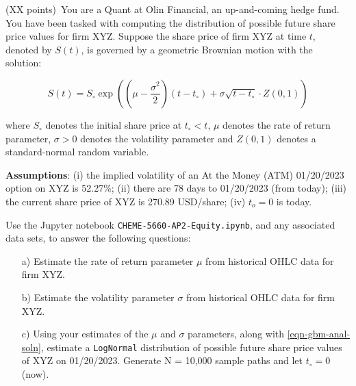 \item{(XX points)~You are a Quant at Olin Financial, an up-and-coming hedge fund. You have been tasked with computing the distribution of possible future share price values for firm XYZ.
Suppose the share price of firm XYZ at time $t$, denoted by $S(t)$, is governed by a geometric Brownian motion with the solution:

\begin{equation}\label{eqn-gbm-anal-soln}
S(t) = S_{\circ}\exp\left(\left(\mu - \frac{\sigma^{2}}{2}\right)\left(t-t_{\circ}\right)+\sigma\sqrt{t-t_{\circ}}\cdot{Z(0,1)}\right)
\end{equation}

where $S_{\circ}$ denotes the initial share price at $t_{\circ}<t$, $\mu$ denotes the rate of return parameter, 
$\sigma>0$ denotes the volatility parameter and $Z\left(0,1\right)$ denotes a standard-normal random variable. 

\textbf{Assumptions}: (i) the implied volatility of an At the Money (ATM) 01/20/2023 option on XYZ is 52.27\%; 
(ii) there are 78 days to 01/20/2023 (from today); (iii) the current share price of XYZ is 270.89 USD/share; 
(iv) $t_{o} = 0$ is today.

Use the Jupyter notebook \texttt{CHEME-5660-AP2-Equity.ipynb}, and any associated data sets, to answer the following questions:
\begin{itemize}
    \item[a)]{Estimate the rate of return parameter $\mu$ from historical OHLC data for firm XYZ.}
    \item[b)]{Estimate the volatility parameter $\sigma$ from historical OHLC data for firm XYZ.}
    \item[c)]{Using your estimates of the $\mu$ and $\sigma$ parameters, along with \eqref{eqn-gbm-anal-soln}, estimate a \texttt{LogNormal} distribution of possible future share price values of XYZ on 01/20/2023.
    Generate N = 10,000 sample paths and let $t_{\circ} = 0$ (now).}
\end{itemize}
}
